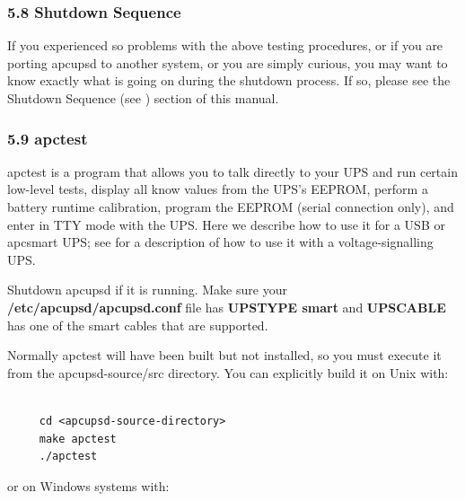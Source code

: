 {{{{\label{Shutdown-Sequence}

\subsubsection*{5.8 Shutdown Sequence}

\label{index-Shutdown-Sequence-99}
If you experienced so problems with the above testing procedures, or if you
are porting apcupsd to another system, or you are simply curious, you may want
to know exactly what is going on during the shutdown process. If so, please
see the Shutdown Sequence (see 
) section of this
manual. 

\label{apctest}

\subsubsection*{5.9 apctest}

\label{index-apctest-100}
apctest is a program that allows you to talk directly to your UPS and run
certain low-level tests, display all know values from the UPS's EEPROM,
perform a battery runtime calibration, program the EEPROM (serial connection
only), and enter in TTY mode with the UPS. Here we describe how to use it for
a USB or apcsmart UPS; see 
 for a description
of how to use it with a voltage-signalling UPS.  

Shutdown apcupsd if it is running. Make sure your {\bf
/etc/apcupsd/apcupsd.conf} file has {\bf UPSTYPE smart} and {\bf UPSCABLE} has
one of the smart cables that are supported.  

Normally apctest will have been built but not installed, so you must execute
it from the \lt{}apcupsd-source\gt{}/src directory. You can explicitly build
it on Unix with: 

\footnotesize
\begin{verbatim}
     
     cd <apcupsd-source-directory>
     make apctest
     ./apctest
\end{verbatim}
\normalsize

or on Windows systems with: 

\footnotesize
\begin{verbatim}
     

\end{verbatim}}}}}

